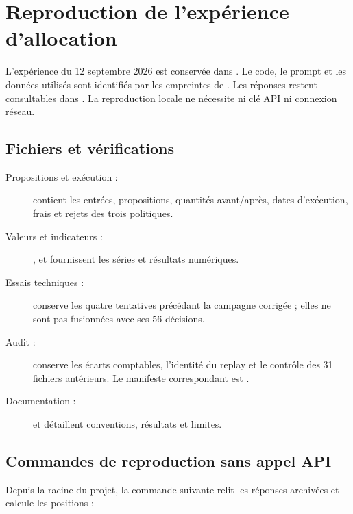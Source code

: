 \chapter{Reproduction de l'expérience d'allocation}\label{ann:allocation}

L'expérience du 12 septembre 2026 est conservée dans . Le code, le prompt et les données utilisés sont identifiés par les empreintes de . Les réponses restent consultables dans . La reproduction locale ne nécessite ni clé API ni connexion réseau.

\section{Fichiers et vérifications}

\begin{description}
\item[Propositions et exécution :]  contient les entrées, propositions, quantités avant/après, dates d'exécution, frais et rejets des trois politiques.
\item[Valeurs et indicateurs :] ,  et  fournissent les séries et résultats numériques.
\item[Essais techniques :]  conserve les quatre tentatives précédant la campagne corrigée ; elles ne sont pas fusionnées avec ses 56 décisions.
\item[Audit :]  conserve les écarts comptables, l'identité du replay et le contrôle des 31 fichiers antérieurs. Le manifeste correspondant est .
\item[Documentation :]  et  détaillent conventions, résultats et limites.
\end{description}

\section{Commandes de reproduction sans appel API}

Depuis la racine du projet, la commande suivante relit les réponses archivées et calcule les positions :

